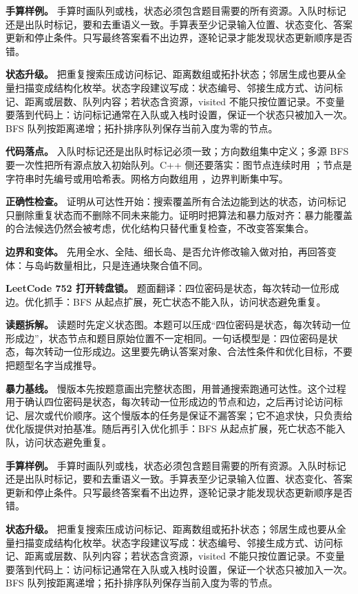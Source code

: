 \textbf{手算样例。} 手算时画队列或栈，状态必须包含题目需要的所有资源。入队时标记还是出队时标记，要和去重语义一致。手算表至少记录输入位置、状态变化、答案更新和停止条件。只写最终答案看不出边界，逐轮记录才能发现状态更新顺序是否错。

\textbf{状态升级。} 把重复搜索压成访问标记、距离数组或拓扑状态；邻居生成也要从全量扫描变成结构化枚举。状态字段建议写成：状态编号、邻接生成方式、访问标记、距离或层数、队列内容；若状态含资源，visited 不能只按位置记录。不变量要落到代码上：访问标记通常在入队或入栈时设置，保证一个状态只被加入一次。BFS 队列按距离递增；拓扑排序队列保存当前入度为零的节点。

\textbf{代码落点。} 入队时标记还是出队时标记必须一致；方向数组集中定义；多源 BFS 要一次性把所有源点放入初始队列。C++ 侧还要落实：图节点连续时用 ；节点是字符串时先编号或用哈希表。网格方向数组用 ，边界判断集中写。

\textbf{正确性检查。} 证明从可达性开始：搜索覆盖所有合法边能到达的状态，访问标记只删除重复状态而不删除不同未来能力。证明时把算法和暴力版对齐：暴力能覆盖的合法候选仍然会被考虑，优化结构只替代重复检查，不改变答案集合。

\textbf{边界和变体。} 先用全水、全陆、细长岛、是否允许修改输入做对拍，再回答变体：与岛屿数量相比，只是连通块聚合值不同。

\noindent\textbf{LeetCode 752 打开转盘锁。} 题面翻译：四位密码是状态，每次转动一位形成边。优化抓手：BFS 从起点扩展，死亡状态不能入队，访问状态避免重复。

\textbf{读题拆解。} 读题时先定义状态图。本题可以压成“四位密码是状态，每次转动一位形成边”，状态节点和题目原始位置不一定相同。一句话模型是：四位密码是状态，每次转动一位形成边。这里要先确认答案对象、合法性条件和优化目标，不要把题型名字当成推导。

\textbf{暴力基线。} 慢版本先按题意画出完整状态图，用普通搜索跑通可达性。这个过程用于确认四位密码是状态，每次转动一位形成边的节点和边，之后再讨论访问标记、层次或代价顺序。这个慢版本的任务是保证不漏答案；它不追求快，只负责给优化版提供对拍基准。随后再引入优化抓手：BFS 从起点扩展，死亡状态不能入队，访问状态避免重复。

\textbf{手算样例。} 手算时画队列或栈，状态必须包含题目需要的所有资源。入队时标记还是出队时标记，要和去重语义一致。手算表至少记录输入位置、状态变化、答案更新和停止条件。只写最终答案看不出边界，逐轮记录才能发现状态更新顺序是否错。

\textbf{状态升级。} 把重复搜索压成访问标记、距离数组或拓扑状态；邻居生成也要从全量扫描变成结构化枚举。状态字段建议写成：状态编号、邻接生成方式、访问标记、距离或层数、队列内容；若状态含资源，visited 不能只按位置记录。不变量要落到代码上：访问标记通常在入队或入栈时设置，保证一个状态只被加入一次。BFS 队列按距离递增；拓扑排序队列保存当前入度为零的节点。

